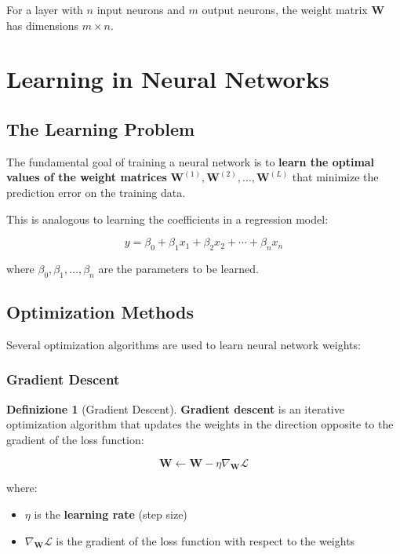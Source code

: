 \documentclass[11pt,a4paper]{article}
\theoremstyle{definition}
\newtheorem{definition}{Definizione}[section]
\theoremstyle{plain}
\theoremstyle{remark}
\begin{document}
For a layer with $n$ input neurons and $m$ output neurons, the weight matrix $\mathbf{W}$ has dimensions $m \times n$.



\section{Learning in Neural Networks}

\subsection{The Learning Problem}

\begin{tcolorbox}[colback=orange!5!white,colframe=orange!75!black,title=\textbf{Objective: Learning the Weights}]
The fundamental goal of training a neural network is to \textbf{learn the optimal values of the weight matrices} $\mathbf{W}^{(1)}, \mathbf{W}^{(2)}, \dots, \mathbf{W}^{(L)}$ that minimize the prediction error on the training data.
\end{tcolorbox}

This is analogous to learning the coefficients in a regression model:

\[
y = \beta_0 + \beta_1 x_1 + \beta_2 x_2 + \cdots + \beta_n x_n
\]

where $\beta_0, \beta_1, \dots, \beta_n$ are the parameters to be learned.

\subsection{Optimization Methods}

Several optimization algorithms are used to learn neural network weights:

\subsubsection{Gradient Descent}

\begin{definition}[Gradient Descent]
\textbf{Gradient descent} is an iterative optimization algorithm that updates the weights in the direction opposite to the gradient of the loss function:

\[
\mathbf{W} \leftarrow \mathbf{W} - \eta \nabla_{\mathbf{W}} \mathcal{L}
\]

where:
\begin{itemize}
    \item $\eta$ is the \textbf{learning rate} (step size)
    \item $\nabla_{\mathbf{W}} \mathcal{L}$ is the gradient of the loss function with respect to the weights
\end{itemize}
\end{definition}
\end{document}
